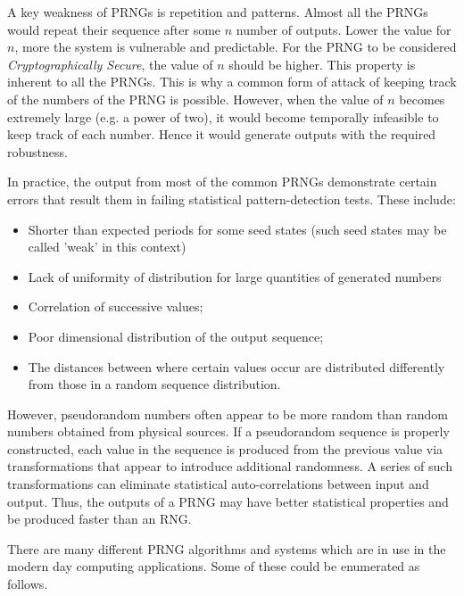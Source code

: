 A key weakness of PRNGs is repetition and patterns. Almost all the PRNGs would repeat their sequence after some $n$ number of outputs. Lower the value for $n$, more the system is vulnerable and predictable. For the PRNG to be considered \textit{Cryptographically Secure}, the value of $n$ should be higher. This property is inherent to all the PRNGs. This is why a common form of attack of keeping track of the numbers of the PRNG is possible. However, when the value of $n$ becomes extremely large (e.g. a power of two), it would become temporally infeasible to keep track of each number. Hence it would generate outputs with the required robustness.

In practice, the output from most of the common PRNGs demonstrate certain errors that result them in failing statistical pattern-detection tests. These include:

\begin{itemize}
    \item Shorter than expected periods for some seed states (such seed states may be called 'weak' in this context)
    \item Lack of uniformity of distribution for large quantities of generated numbers
    \item Correlation of successive values;
    \item Poor dimensional distribution of the output sequence;
    \item The distances between where certain values occur are distributed differently from those in a random sequence distribution.
\end{itemize}

However, pseudorandom numbers often appear to be more random than random numbers obtained from physical sources. If a pseudorandom sequence is properly constructed, each value in the sequence is produced from the previous value via transformations that appear to introduce additional randomness. A series of such transformations can eliminate statistical auto-correlations between input and output. Thus, the outputs of a PRNG may have better statistical properties and be produced faster than an RNG.

There are many different PRNG algorithms and systems which are in use in the modern day computing applications. Some of these could be enumerated as follows.

